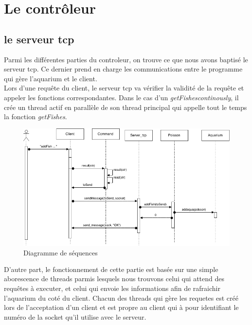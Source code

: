 \section{Le contrôleur}

\subsection{le serveur tcp}

\indent Parmi les différentes parties du controleur, on trouve ce que nous avons baptisé le serveur tcp.
Ce dernier prend en charge les communications entre le programme qui gère l'aquarium et le client.\\
\indent Lors d'une requête du client, le serveur tcp va vérifier la validité de la requête et appeler les fonctions correspondantes.
Dans le cas d'un \textit{getFishescontinously},
il crée un thread actif en parallèle de son thread principal qui appelle tout le temps la fonction \textit{getFishes}.

\begin{figure}[!h]
\caption{\label{handlers} Diagramme de séquences}
\begin{center}\includegraphics[scale=0.5]{Diagram}\end{center}
\end{figure}

D'autre part, le fonctionnement de cette partie est basée sur une simple aborescence de threads parmis lesquels nous
trouvons celui qui attend des requêtes à executer, et celui qui envoie les informations afin de rafraichir
l'aquarium du coté du client. Chacun des threads qui gère les requetes  est créé lors de l'acceptation
d'un client et est propre au client qui à pour identifiant le numéro de la socket qu'il utilise avec le serveur.

